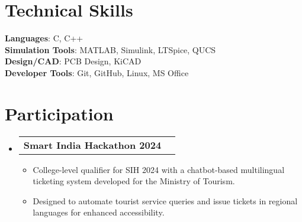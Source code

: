 \documentclass[letterpaper,11pt]{article}
\makeatletter
\newcommand{\resumeItem}[1]{
  \item\small{
    {#1 \vspace{-2pt}}
  }
}
\newcommand{\resumeProjectHeading}[2]{
    \item
    \begin{tabular*}{0.97\textwidth}{l@{\extracolsep{\fill}}r}
      \small#1 & #2 \\
    \end{tabular*}\vspace{-7pt}
}
\newcommand{\resumeSubHeadingListStart}{\begin{itemize}[leftmargin=0.15in, label={}]}
\newcommand{\resumeSubHeadingListEnd}{\end{itemize}}
\newcommand{\resumeItemListStart}{\begin{itemize}}
\newcommand{\resumeItemListEnd}{\end{itemize}\vspace{-5pt}}
\makeatother
\begin{document}
\section{Technical Skills}
 \begin{itemize}[leftmargin=0.15in, label={}]
    \small{\item{
     \textbf{Languages}{: C, C++} \\
     \textbf{Simulation Tools}{: MATLAB, Simulink, LTSpice, QUCS} \\
     \textbf{Design/CAD}{: PCB Design, KiCAD} \\
     \textbf{Developer Tools}{: Git, GitHub, Linux, MS Office}
    }}
 \end{itemize}


\section{Participation}
  \resumeSubHeadingListStart

    \resumeProjectHeading
      {\textbf{Smart India Hackathon 2024}}{}
      \resumeItemListStart
        \resumeItem{College-level qualifier for SIH 2024 with a chatbot-based multilingual ticketing system developed for the Ministry of Tourism.}
        \resumeItem{Designed to automate tourist service queries and issue tickets in regional languages for enhanced accessibility.}
      \resumeItemListEnd

  \resumeSubHeadingListEnd




\end{document}
